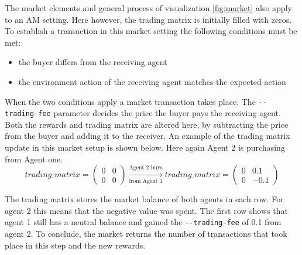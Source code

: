 The market elements and general process of visualization \ref{fig:market} also apply to an AM setting. Here however, the trading matrix is initially filled with zeros. 
To establish a transaction in this market setting the following conditions must be met:
\begin{itemize}
    \item the buyer differs from the receiving agent
    \item the environment action of the receiving agent matches the expected action
\end{itemize}

When the two conditions apply a market transaction takes place. The \verb|--trading-fee| parameter decides the price the buyer pays the receiving agent. Both the rewards and trading matrix are altered here, by subtracting the price from the buyer and adding it to the receiver. An example of the trading matrix update in this market setup is shown below. Here again Agent 2 is purchasing from Agent one.
\begin{equation*}
trading\_matrix = 
\begin{pmatrix}
0 & 0 \\
0 & 0
\end{pmatrix} \xrightarrow[\text{from Agent 1}]{\text{Agent 2 buys}} 
trading\_matrix = 
\begin{pmatrix}
0 & 0.1 \\
0 & -0.1
\end{pmatrix} 
\end{equation*}

The trading matrix stores the market balance of both agents in each row. For agent 2 this means that the negative value was spent. The first row shows that agent 1 still has a neutral balance and gained the \verb|--trading-fee| of 0.1 from agent 2. To conclude, the market returns the number of transactions that took place in this step and the new rewards.

